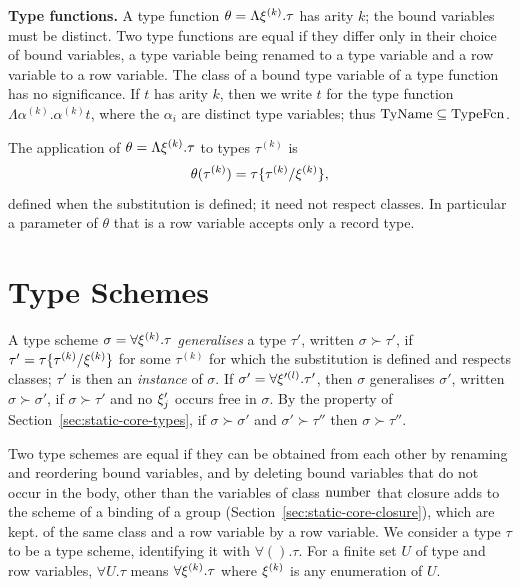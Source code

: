 \textbf{Type functions.} A type function $\theta = \Lambda\xi^{(k)}.\tau$
has arity $k$; the bound variables must be distinct. Two type functions are
equal if they differ only in their choice of bound variables, a type variable
being renamed to a type variable and a row variable to a row variable. The class
of a bound type variable of a type function has no significance.
If $t$ has arity $k$, then we write $t$ for the type function
$\Lambda\alpha^{(k)}.\alpha^{(k)}t$, where the $\alpha_i$ are distinct type
variables; thus $\mathrm{TyName} \subseteq \mathrm{TypeFcn}$.

The application of $\theta = \Lambda\xi^{(k)}.\tau$ to types
$\tau^{(k)}$ is
\[
  \theta(\tau^{(k)}) = \tau\{\tau^{(k)}/\xi^{(k)}\},
\]
defined when the substitution is defined; it need not respect classes. In
particular a parameter of $\theta$ that is a row variable accepts only a record
type.

\section{Type Schemes}\label{sec:static-core-schemes}

A type scheme $\sigma = \forall\xi^{(k)}.\tau$ \emph{generalises} a type
$\tau'$, written $\sigma \succ \tau'$, if $\tau' =
\tau\{\tau^{(k)}/\xi^{(k)}\}$ for some $\tau^{(k)}$ for which the
substitution is defined and respects classes; $\tau'$ is then an
\emph{instance} of $\sigma$. If $\sigma' = \forall\xi'^{(l)}.\tau'$, then
$\sigma$ generalises $\sigma'$, written $\sigma \succ \sigma'$, if $\sigma \succ
\tau'$ and no $\xi'_j$ occurs free in $\sigma$. By the property of
Section~\ref{sec:static-core-types}, if $\sigma \succ \sigma'$ and $\sigma' \succ
\tau''$ then $\sigma \succ \tau''$.

Two type schemes are equal if they can be obtained from each other by renaming
and reordering bound variables, and by deleting bound variables that do not
occur in the body, other than the variables of class $\mathrm{number}$ that closure adds
to the scheme of a binding of a group (Section~\ref{sec:static-core-closure}),
which are kept. %
of the same class and a row variable by a row variable. We consider a type
$\tau$ to be a type scheme, identifying it with $\forall().\tau$. For a finite
set $U$ of type and row variables, $\forall U.\tau$ means
$\forall\xi^{(k)}.\tau$ where $\xi^{(k)}$ is any enumeration of $U$.

